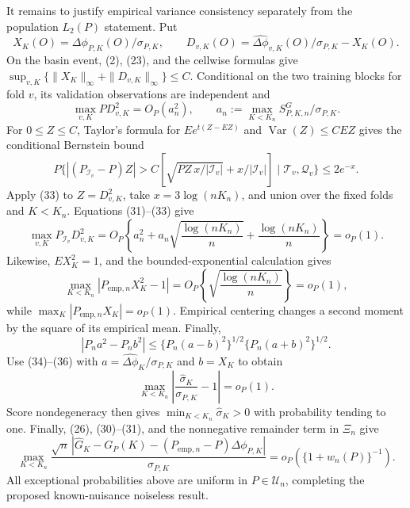 It remains to justify empirical variance consistency separately from the population \(L_2(P)\) statement.  Put
\[
 X_K(O)=\Delta\phi_{P,K}(O)/\sigma_{P,K},\qquad
 D_{v,K}(O)=\widehat{\Delta\phi}_{v,K}(O)/\sigma_{P,K}-X_K(O).
\]
On the basin event, (2), (23), and the cellwise formulas give
\(\sup_{v,K}\{\|X_K\|_\infty+\|D_{v,K}\|_\infty\}\leq C\).  Conditional on the two training blocks for fold \(v\), its validation observations are independent and
\[
 \max_{v,K}P D_{v,K}^2=O_P(a_n^2),\qquad
 a_n:=\max_{K<K_n}S^G_{P,K,n}/\sigma_{P,K}.                                   \tag{32}
\]
For \(0\leq Z\leq C\), Taylor's formula for \(Ee^{t(Z-EZ)}\) and
\(\operatorname{Var}(Z)\leq C EZ\) gives the conditional Bernstein bound
\[
 P\{|(P_{\mathcal I_v}-P)Z|>
 C[\sqrt{PZ\,x/|\mathcal I_v|}+x/|\mathcal I_v|]\mid\mathcal T_v,\mathcal Q_v\}
 \leq2e^{-x}.                                                                  \tag{33}
\]
Apply (33) to \(Z=D_{v,K}^2\), take \(x=3\log(nK_n)\), and union over the fixed folds and \(K<K_n\).  Equations (31)--(33) give
\[
 \max_{v,K}P_{\mathcal I_v}D_{v,K}^2
 =O_P\!\left\{a_n^2+a_n\sqrt{\frac{\log(nK_n)}n}
 +\frac{\log(nK_n)}n\right\}=o_P(1).                                          \tag{34}
\]
Likewise, \(EX_K^2=1\), and the bounded-exponential calculation gives
\[
 \max_{K<K_n}|P_{\mathrm{emp},n}X_K^2-1|
 =O_P\!\left\{\sqrt{\frac{\log(nK_n)}n}\right\}=o_P(1),                        \tag{35}
\]
while \(\max_K|P_{\mathrm{emp},n}X_K|=o_P(1)\).  Empirical centering changes a second moment by the square of its empirical mean.  Finally,
\[
 |P_n a^2-P_n b^2|
 \leq\{P_n(a-b)^2\}^{1/2}\{P_n(a+b)^2\}^{1/2}.                                \tag{36}
\]
Use (34)--(36) with \(a=\widehat{\Delta\phi}_K/\sigma_{P,K}\) and \(b=X_K\) to obtain
\[
 \max_{K<K_n}\left|\frac{\widehat\sigma_K}{\sigma_{P,K}}-1\right|=o_P(1).       \tag{37}
\]
Score nondegeneracy then gives \(\min_{K<K_n}\widehat\sigma_K>0\) with probability tending to one.  Finally, (26), (30)--(31), and the nonnegative remainder term in \(\Xi_n\) give
\[
 \max_{K<K_n}
 \frac{\sqrt n\,|\widehat G_K-G_P(K)-(P_{\mathrm{emp},n}-P)\Delta\phi_{P,K}|}
 {\sigma_{P,K}}
 =o_P\!\left(\{1+w_n(P)\}^{-1}\right).                                        \tag{38}
\]
All exceptional probabilities above are uniform in \(P\in\mathcal U_n\), completing the proposed known-nuisance noiseless result.